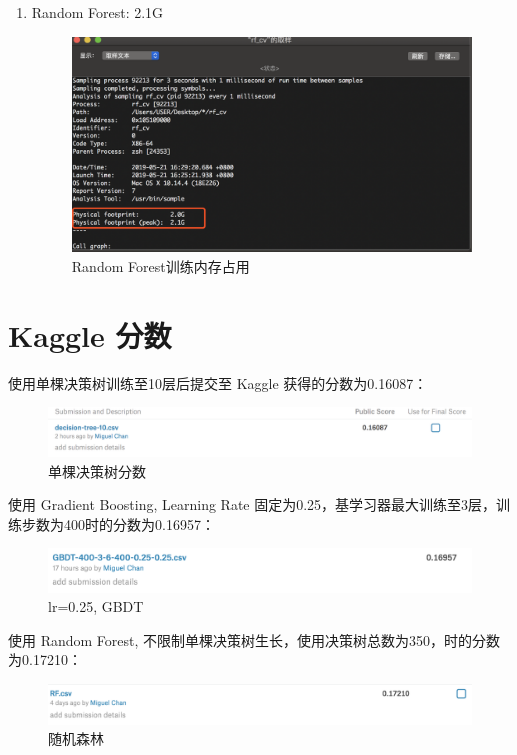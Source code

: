 \documentclass[12pt]{article}
\begin{document}
\begin{enumerate}
    \item Random Forest: 2.1G
    \begin{figure}[H]
        \centering
        \includegraphics[scale=0.44]{rf-memory.png}
        \caption{Random Forest训练内存占用}
        \label{}
    \end{figure}
\end{enumerate}

\section{Kaggle 分数}

使用单棵决策树训练至10层后提交至 Kaggle 获得的分数为0.16087：
\begin{figure}[H]
    \centering
    \includegraphics[scale=0.5]{single-tree-300-10-kaggle.png}
    \caption{单棵决策树分数}
    \label{}
\end{figure}

使用 Gradient Boosting, Learning Rate 固定为0.25，基学习器最大训练至3层，训练步数为400时的分数为0.16957：
\begin{figure}[H]
    \centering
    \includegraphics[scale=0.5]{gbdt-fixed-lr-kaggle.png}
    \caption{lr=0.25, GBDT}
    \label{}
\end{figure}

使用 Random Forest, 不限制单棵决策树生长，使用决策树总数为350，时的分数为0.17210：
\begin{figure}[H]
    \centering
    \includegraphics[scale=0.5]{RF-400-4-005-350.png}
    \caption{随机森林}
    \label{}
\end{figure}
\end{document}
